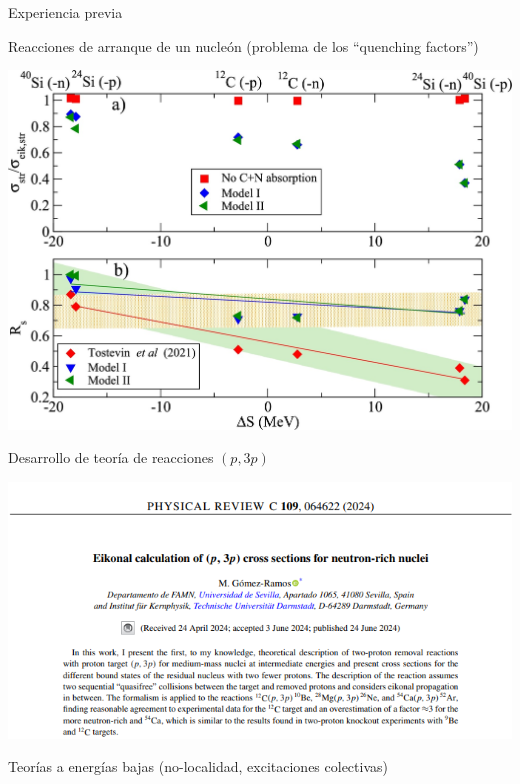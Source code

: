 \documentclass{beamer}
\begin{document}
\begin{frame}{Experiencia previa} 

   \begin{minipage}{0.45\textwidth}
    \tiny Reacciones de arranque de un nucleón (problema de los “quenching
   factors”)
   
    \includegraphics[height=0.3\textheight]{quenching.jpg}
    \end{minipage}
    \begin{minipage}{0.45\textwidth}
     \tiny Desarrollo de teoría de reacciones $(p,3p)$
    
    \includegraphics[height=0.3\textheight]{p3p.png}
    
    \end{minipage}

    \begin{minipage}{0.45\textwidth}
     \tiny Teorías a energías bajas (no-localidad, excitaciones colectivas)    
    

\end{minipage}
\end{frame}
\end{document}
